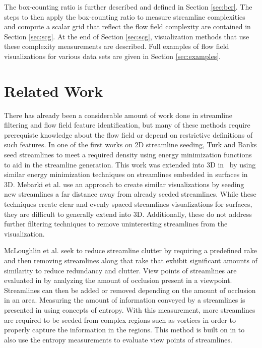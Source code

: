 \documentclass{egpubl}
\begin{document}
The box-counting ratio is further described and defined in Section \ref{sec:bcr}.
The steps to then apply the box-counting ratio to measure streamline complexities and compute a scalar grid that reflect the flow field complexity are contained in Section \ref{sec:scg}.
At the end of Section \ref{sec:scg}, visualization methods that use these complexity measurements are described.
Full examples of flow field visualizations for various data sets are given in Section \ref{sec:examples}.

\section{Related Work}

There has already been a considerable amount of work done in streamline filtering and flow field feature identification, but many of these methods require prerequiste knowledge about the flow field or depend on restrictive definitions of such features.
In one of the first works on 2D streamline seeding, Turk and Banks \cite{turk} seed streamlines to meet a required density using energy minimization functions to aid in the streamline generation.
This work was extended into 3D in~\cite{mao} by using similar energy minimization techniques on streamlines embedded in surfaces in 3D.
Mebarki et al. \cite{mebarki} use an approach to create similar visualizations by seeding new streamlines a far distance away from already seeded streamlines.
While these techniques create clear and evenly spaced streamlines visualizations for surfaces, they are difficult to generally extend into 3D.
Additionally, these do not address further filtering techniques to remove uninteresting streamlines from the visualization.

McLoughlin et al. \cite{mcloughlin} seek to reduce streamline clutter by requiring a predefined rake and then removing streamlines along that rake that exhibit significant amounts of similarity to reduce redundancy and clutter.
View points of streamlines are evaluated in \cite{marchesin} by analyzing the amount of occlusion present in a viewpoint.
Streamlines can then be added or removed depending on the amount of occlusion in an area.
Measuring the amount of information conveyed by a streamlines is presented in \cite{shen} using concepts of entropy.
With this measurement, more streamlines are required to be seeded from complex regions such as vortices in order to properly capture the information in the regions.
This method is built on in \cite{lee} to also use the entropy measurements to evaluate view points of streamlines.
\end{document}
